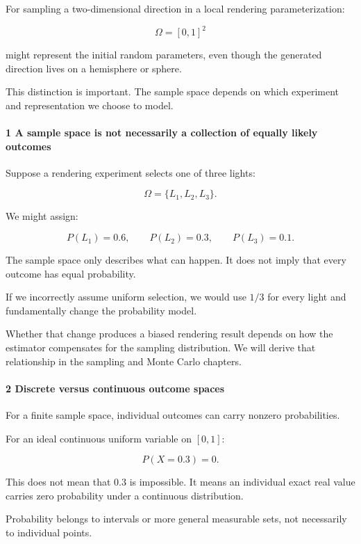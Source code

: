 For sampling a two-dimensional direction in a local rendering parameterization:

\[
 \Omega=[0,1]^2
\]

might represent the initial random parameters, even though the generated direction lives on a hemisphere or sphere.

This distinction is important. The sample space depends on which experiment and representation we choose to model.

\paragraph{1 A sample space is not necessarily a collection of equally likely outcomes}\label{a-sample-space-is-not-necessarily-a-collection-of-equally-likely-outcomes}

Suppose a rendering experiment selects one of three lights:

\[
 \Omega=\{L_1,L_2,L_3\}.
\]

We might assign:

\[
 P(L_1)=0.6,\qquad P(L_2)=0.3,\qquad P(L_3)=0.1.
\]

The sample space only describes what can happen. It does not imply that every outcome has equal probability.

If we incorrectly assume uniform selection, we would use \(1/3\) for every light and fundamentally change the probability model.

Whether that change produces a biased rendering result depends on how the estimator compensates for the sampling distribution. We will derive that relationship in the sampling and Monte Carlo chapters.

\paragraph{2 Discrete versus continuous outcome spaces}\label{discrete-versus-continuous-outcome-spaces}

For a finite sample space, individual outcomes can carry nonzero probabilities.

For an ideal continuous uniform variable on \([0,1]\):

\[
 P(X=0.3)=0.
\]

This does not mean that \(0.3\) is impossible. It means an individual exact real value carries zero probability under a continuous distribution.

Probability belongs to intervals or more general measurable sets, not necessarily to individual points.


